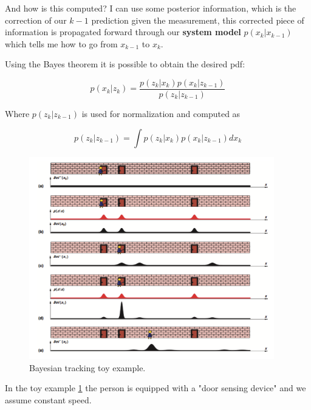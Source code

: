 And how is this computed? I can use some posterior information, which is the correction of our $k-1$ prediction given the measurement, this corrected piece of information is propagated forward through our \textbf{system model} $p(x_k|x_{k-1})$ which tells me how to go from $x_{k-1}$ to $x_k$. 

Using the Bayes theorem it is possible to obtain the desired pdf:

\[
    p(x_k|z_k) = \frac{p(z_k|x_k)p(x_k|z_{k-1})}{p(z_k|z_{k-1})}
\]

Where $p(z_k|z_{k-1})$ is used for normalization and computed as

\[
    p(z_k|z_{k-1}) = \int p(z_k|x_k)p(x_k|z_{k-1})dx_k
\]

\begin{figure}[H]
    \centering
    \includegraphics[width=0.95\textwidth]{Figures/bayes.png}
    \caption{Bayesian tracking toy example.}
    \label{img:bayes}
\end{figure}

In the toy example \ref{img:bayes} the person is equipped with a "door sensing device" and we assume constant speed. 


